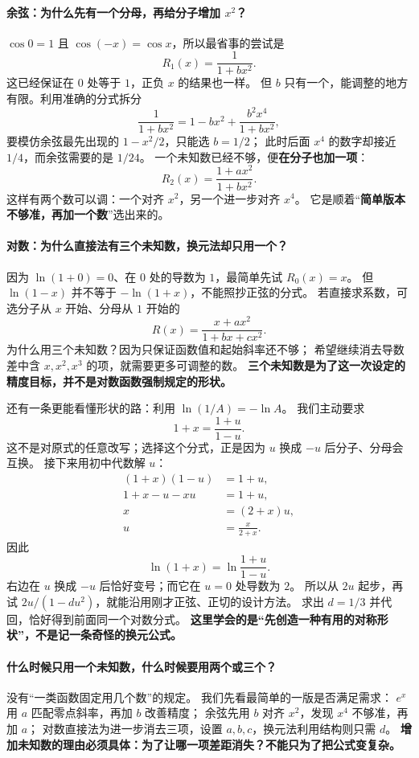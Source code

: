 \begin{explanationbox}
\paragraph{余弦：为什么先有一个分母，再给分子增加 $x^2$？}
$\cos0=1$ 且 $\cos(-x)=\cos x$，所以最省事的尝试是
\[
 R_1(x)=\frac1{1+bx^2}.
\]
这已经保证在 $0$ 处等于 $1$，正负 $x$ 的结果也一样。
但 $b$ 只有一个，能调整的地方有限。利用准确的分式拆分
\[
 \frac1{1+bx^2}=1-bx^2+\frac{b^2x^4}{1+bx^2},
\]
要模仿余弦最先出现的 $1-x^2/2$，只能选 $b=1/2$；
此时后面 $x^4$ 的数字却接近 $1/4$，而余弦需要的是 $1/24$。
一个未知数已经不够，便\textbf{在分子也加一项}：
\[
 R_2(x)=\frac{1+ax^2}{1+bx^2}.
\]
这样有两个数可以调：一个对齐 $x^2$，另一个进一步对齐 $x^4$。
它是顺着“\textbf{简单版本不够准，再加一个数}”选出来的。

\paragraph{对数：为什么直接法有三个未知数，换元法却只用一个？}
因为 $\ln(1+0)=0$、在 $0$ 处的导数为 $1$，最简单先试 $R_0(x)=x$。
但 $\ln(1-x)$ 并不等于 $-\ln(1+x)$，不能照抄正弦的分式。
若直接求系数，可选分子从 $x$ 开始、分母从 $1$ 开始的
\[
 R(x)=\frac{x+ax^2}{1+bx+cx^2}.
\]
为什么用三个未知数？因为只保证函数值和起始斜率还不够；
希望继续消去导数差中含 $x,x^2,x^3$ 的项，就需要更多可调整的数。
\textbf{三个未知数是为了这一次设定的精度目标，并不是对数函数强制规定的形状。}

还有一条更能看懂形状的路：利用 $\ln(1/A)=-\ln A$。
我们主动要求
\[
 1+x=\frac{1+u}{1-u}.
\]
这不是对原式的任意改写；选择这个分式，正是因为 $u$ 换成 $-u$ 后分子、分母会互换。
接下来用初中代数解 $u$：
\[
 \begin{aligned}
 (1+x)(1-u)&=1+u,\\
 1+x-u-xu&=1+u,\\
 x&=(2+x)u,\\
 u&=\boxed{\frac{x}{2+x}}.
 \end{aligned}
\]
因此
\[
 \ln(1+x)=\ln\frac{1+u}{1-u}.
\]
右边在 $u$ 换成 $-u$ 后恰好变号；而它在 $u=0$ 处导数为 $2$。
所以从 $2u$ 起步，再试 $2u/(1-du^2)$，就能沿用刚才正弦、正切的设计方法。
求出 $d=1/3$ 并代回，恰好得到前面同一个对数分式。
\textbf{这里学会的是“先创造一种有用的对称形状”，不是记一条奇怪的换元公式。}

\paragraph{什么时候只用一个未知数，什么时候要用两个或三个？}
没有“一类函数固定用几个数”的规定。
我们先看最简单的一版是否满足需求：
$e^x$ 用 $a$ 匹配零点斜率，再加 $b$ 改善精度；
余弦先用 $b$ 对齐 $x^2$，发现 $x^4$ 不够准，再加 $a$；
对数直接法为进一步消去三项，设置 $a,b,c$，换元法利用结构则只需 $d$。
\textbf{增加未知数的理由必须具体：为了让哪一项差距消失？不能只为了把公式变复杂。}


\end{explanationbox}
